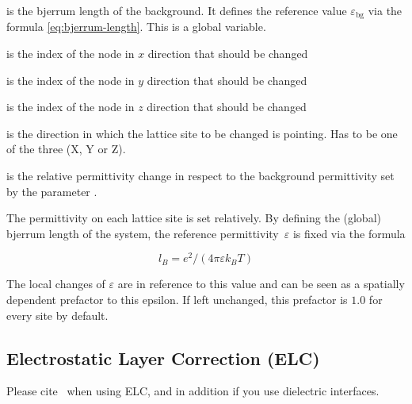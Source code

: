 \begin{arguments}
\item[\var{l_B}] is the bjerrum length of the background. It defines
	the reference value $\varepsilon_\text{bg}$ via the formula 
	\eqref{eq:bjerrum-length}. This is a global variable.
\item[\var{node\_x}] is the index of the node in $x$ direction that
	should be changed
\item[\var{node\_y}] is the index of the node in $y$ direction that
	should be changed
\item[\var{node\_z}] is the index of the node in $z$ direction that
	should be changed
\item[\var{X/Y/Z}] is the direction in which the lattice site to be
	changed is pointing. Has to be one of the three (X, Y or Z).
\item[\var{\varepsilon}] is the relative permittivity change in
	respect to the background permittivity set by the parameter
	.
\end{arguments}

The permittivity on each lattice site is set relatively. By defining
the (global) bjerrum length of the system, the reference
permittivity~$\varepsilon$ is fixed via the formula

\begin{equation}
l_B = e^2 / (4 \pi \varepsilon k_B T)
\label{eq:bjerrum-length}
\end{equation}

The local changes of $\varepsilon$ are in reference to this value
and can be seen as a spatially dependent prefactor to this epsilon.
If left unchanged, this prefactor is $1.0$ for every site by
default.

\subsection{Electrostatic Layer Correction (ELC)}

\begin{citebox}
  Please cite~ when using ELC, and in addition
   if you use dielectric interfaces.
\end{citebox}

